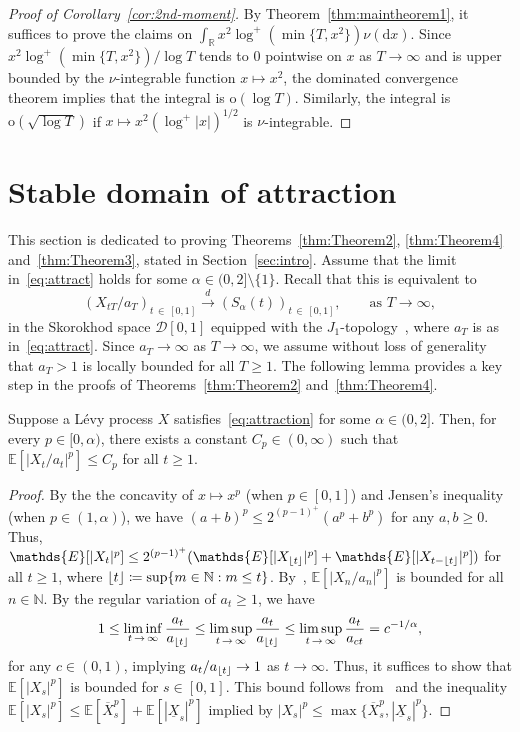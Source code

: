 \documentclass[AHL,Unicode,longabstracts,published]{cedram}
\DeclarePairedDelimiter\floor{\lfloor}{\rfloor}
\newcommand\N{\mathbb{N}}
\newcommand\R{\mathbb{R}}
\newcommand\E{\mathds{E}}
\newcommand\1{\mathds{1}}
\newcommand\D{\mathrm{d}}
\newcommand\oh{\mathrm{o}}
\newcommand{\calD}{\mathcal{D}}
\newcommand\cid{\xrightarrow{d}}
\newcommand\ov[1]{\overline{#1}}
\newcommand\un[1]{\underline{#1}}
\begin{document}
\begin{proof}[Proof of Corollary~\ref{cor:2nd-moment}]
By Theorem~\ref{thm:maintheorem1}, it suffices to prove the claims on $\int_\R x^2\log^+(\min\{T, x^2\})\nu(\D x)$. Since $x^2\log^+(\min\{T, x^2\})/\log T$ tends to $0$ pointwise on $x$ as $T\to\infty$ and is upper bounded by the $\nu$-integrable function $x\mapsto x^2$, the dominated convergence theorem implies that the integral is $\oh(\log T)$. Similarly, the integral is $\oh(\sqrt{\log T})$ if $x\mapsto x^2(\log^+|x|)^{1/2}$ is $\nu$-integrable.
\end{proof}

\section{Stable domain of attraction}\label{sec:stable_domain}
This section is dedicated to proving Theorems~\ref{thm:Theorem2}, \ref{thm:Theorem4} and~\ref{thm:Theorem3}, stated in Section~\ref{sec:intro}. Assume that the limit in~\eqref{eq:attract} holds for some $\alpha\in(0,2]\setminus\{1\}$. Recall that this is equivalent to
\begin{equation}\label{eq:attraction}
\left(X_{tT}/a_T\right)_{t\,\in\,[0,1]}
\cid \left(S_\alpha(t)\right)_{t\,\in\,[0,1]},
\qquad\text{as }T\to\infty,
\end{equation}
in the Skorokhod space $\calD[0,1]$ equipped with the $J_1$-topology~\cite[Chapter~3]{BillingsleyConvergence}, where $a_T$ is as in~\eqref{eq:attract}. Since $a_T\to\infty$ as $T\to\infty$, we assume without loss of generality that $a_T>1$ is locally bounded for all $T\ge 1$. The following lemma provides a key step in the proofs of Theorems~\ref{thm:Theorem2} and~\ref{thm:Theorem4}.

\begin{lemm}\label{lem:stable_mom}
Suppose a Lévy process $X$ satisfies~\eqref{eq:attraction} for some $\alpha\in(0,2]$. Then, for every $p\in[0,\alpha)$, there exists a constant $C_p\in(0,\infty)$ such that $\E[|X_t/a_t|^p]\le C_p$ for all $t\ge 1$.
\end{lemm}

\begin{proof}
By the the concavity of $x\mapsto x^p$ (when $p\in[0, 1]$) and Jensen's inequality (when $p\in(1,\alpha)$), we have $(a+b)^p\le 2^{(p-1)^+}(a^p+b^p)$ for any $a,b\ge 0$. Thus, $\E[|X_t|^p]\le 2^{(p-1)^+}(\E[|X_{\floor{t}}|^p]+\E[|X_{t-\floor{t}}|^p])$ for all $t\ge 1$, where $\floor{t}\coloneqq \sup\{m\in\N:m\le t\}$. By~\cite[Lemma~5.2.2]{IbragimovLinnikBook}, $\E[|X_n/a_n|^p]$ is bounded for all $n\in\N$. By the regular variation of $a_t\ge 1$, we have
\[
1\le\liminf_{t\,\to\,\infty}\frac{a_t}{a_{\floor{t}}}
\le\limsup_{t\,\to\,\infty}\frac{a_t}{a_{\floor{t}}}
\le\limsup_{t\,\to\,\infty}\frac{a_t}{a_{ct}}=c^{-1/\alpha},
\]
for any $c\in(0,1)$, implying $a_t/a_{\floor{t}}\to 1$ as $t\to\infty$. Thus, it suffices to show that $\E[|X_s|^p]$ is bounded for $s\in[0,1]$. This bound follows from~\cite[Lemma~2]{LevySupSim} and the inequality $\E[|X_s|^p]\le\E[\ov{X}_s^p] +\E[|\un{X}_s|^p]$ implied by $|X_s|^p\leq \max\{\ov{X}_s^p,|\un{X}_s|^p\}$.
\end{proof}
\end{document}
